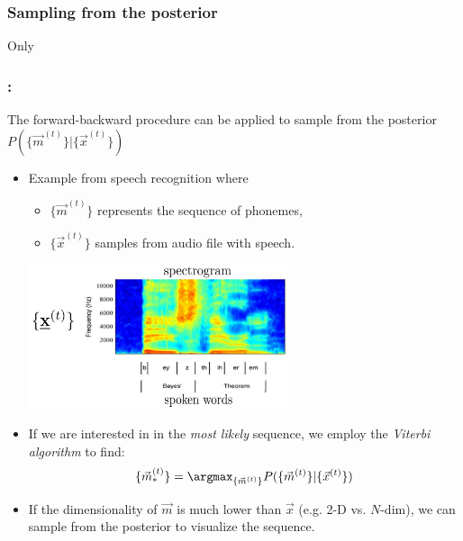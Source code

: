 \subsubsection{Sampling from the posterior}

\begin{frame}{Only}
\frametitle{\subsecname:~\subsubsecname}

The forward-backward procedure can be applied to sample from the posterior
$
P(\{\vec m^{(t)} \} | \{\vec x^{(t)}\} )
$

\begin{itemize}
\item<only@1>
Example from speech recognition where
\begin{itemize}
\item $\{\vec m^{(t)} \}$ represents the sequence of phonemes,
\item $\{\vec x^{(t)} \}$ samples from audio file with speech.
\end{itemize}

\begin{center}
	\includegraphics[width=0.6\textwidth]{img/Bishop_13-1}
\end{center}

\item<only@2> If we are interested in in the \emph{most likely} sequence, we employ the \emph{Viterbi algorithm}
to find:
\begin{equation}
\{\vec m_*^{(t)} \} = 
\argmax_{\{\vec m^{(t)} \}} P(\{\vec m^{(t)} \} | \{\vec x^{(t)}\} )
\end{equation}

\item<only@3>
If the dimensionality of $\vec m$ is much lower than $\vec x$ (e.g. 2-D vs. $N$-dim), we can sample from the posterior to visualize the sequence.

\end{itemize}

\end{frame}

